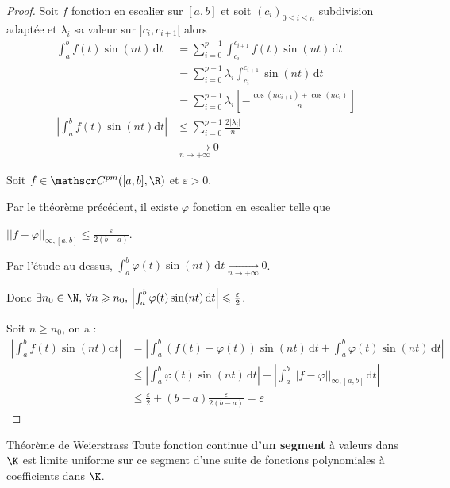 \begin{proof}
    Soit $f$ fonction en escalier sur $[a, b]$ et soit $(c_i)_{0 \leqslant i \leqslant n}$ 
    subdivision adaptée et $\lambda_i$ sa valeur sur $]c_i, c_{i + 1}[$ alors 
    \begin{align}
        \int_{a }^{b } f(t) \sin(nt) \,\mathrm{d}t & = \sum_{i = 0}^{p - 1} \int_{c_i}^{c_{i + 1}} f(t) \sin(nt) \,\mathrm{d}t \\
        & = \sum_{i = 0}^{p - 1} \lambda_i \int_{c_i}^{c_{i + 1}} \sin(nt) \,\mathrm{d}t \\
        & = \sum_{i = 0}^{p - 1} \lambda_i \left[ - \frac{\cos(nc_{i + 1}) + \cos(nc_i)}{n} \right] \\
        \left| \int_{a }^{b } f(t) \sin(nt) \mathrm d t  \right| & \leqslant \sum_{i = 0 }^{p - 1} \frac{2 |\lambda_i|}{n} \\
        & \xrightarrow[n \to + \infty ]{} 0
    \end{align}

    Soit $f \in \mathscr C^{pm}([a, b], \R)$ et $\varepsilon > 0$.

    Par le théorème précédent, il existe $\varphi$ fonction en escalier telle que 
    
    $||f - \varphi||_{\infty, [a, b]} \leqslant \frac \varepsilon {2 (b - a)}$.

    Par l'étude au dessus, $\int_{a }^{b } \varphi(t) \sin(nt) \,\mathrm{d}t \xrightarrow[n \to + \infty ]{} 0$.

    Donc $\exists n_0 \in \N, \, \forall n \geqslant n_0, \, \left| \int_{a }^{b } \varphi(t) \sin(nt) \,\mathrm{d}t \right| \leqslant \frac \varepsilon 2$.

    Soit $n \geqslant n_0$, on a :
    \begin{align}
        \left| \int_a^b f(t) \sin(nt) \mathrm d t  \right| & = \left| \int_a^b (f(t) - \varphi(t)) \sin(nt) \,\mathrm{d}t + \int_a^b \varphi(t) \sin(nt) \,\mathrm{d}t \right| \\
        & \leqslant \left| \int_a^b \varphi(t) \sin(nt) \,\mathrm{d}t \right| + \left| \int_a^b ||f - \varphi||_{\infty, [a, b]} \,\mathrm{d}t \right| \\
        & \leqslant \frac \varepsilon 2 + (b - a) \frac \varepsilon {2 (b - a)} = \varepsilon
    \end{align}

\end{proof}

\begin{theoreme}{Théorème de Weierstrass}{}
    Toute fonction continue \textbf{d'un segment} à valeurs dans $\K$ est limite uniforme sur ce segment 
    d'une suite de fonctions polynomiales à coefficients dans $\K$.
\end{theoreme}

